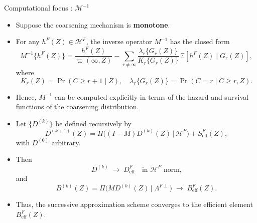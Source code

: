 \documentclass[xcolor=dvipsnames,aspectratio=169]{beamer}
\newcommand{\1}{\mathbbm{1}}
\begin{document}
\begin{frame}{Computational focus : $\mathcal{M}^{-1}$}
  \begin{tcolorbox}[colframe=Cyan,title=Theorem 11.2]
    \begin{itemize}
      \item Suppose the coarsening mechanism is \textbf{monotone}.
      \item For any $h^{F}(Z)\in\mathcal{H}^{F}$, the inverse operator $M^{-1}$ has the closed form
      \[
        M^{-1}\{h^{F}(Z)\}
        = \frac{h^{F}(Z)}{\varpi(\infty,Z)}
        - \sum_{r\neq\infty}
          \frac{\lambda_{r}\{G_{r}(Z)\}}{K_{r}\{G_{r}(Z)\}}
          \,\mathbb{E}\!\left[ h^{F}(Z)\mid G_{r}(Z)\right],
      \]
      where
      \[
        K_{r}(Z) = \Pr(C\ge r+1\mid Z), 
        \quad
        \lambda_{r}\{G_{r}(Z)\} = \Pr(C=r\mid C\ge r, Z).
      \]
      \item Hence, $M^{-1}$ can be computed explicitly in terms of the hazard and survival functions of the coarsening distribution.
    \end{itemize}
  \end{tcolorbox}
  \begin{tcolorbox}[colframe=lightgray,title=Lemma 11.2]
    \begin{itemize}
      \item Let $\{D^{(k)}\}$ be defined recursively by
      \[
        D^{(k+1)}(Z)
        =
        \Pi\!\Big((I-M)D^{(k)}(Z)\,\Big|\,\mathcal{H}^{F}\Big)
        + S^{F}_{\mathrm{eff}}(Z),
      \]
      with $D^{(0)}$ arbitrary.
      \item Then
      \[
        D^{(k)} \;\longrightarrow\; D^{F}_{\mathrm{eff}}
        \quad\text{in $\mathcal{H}^{F}$ norm,}
      \]
      and
      \[
        B^{(k)}(Z)
        = \Pi\!\big(MD^{(k)}(Z)\,\big|\;\Lambda^{F\perp}\big)
        \;\longrightarrow\; B^{F}_{\mathrm{eff}}(Z).
      \]
      \item Thus, the successive approximation scheme converges to the efficient element $B^{F}_{\mathrm{eff}}(Z)$.
    \end{itemize}
  \end{tcolorbox}
\end{frame}
\end{document}
